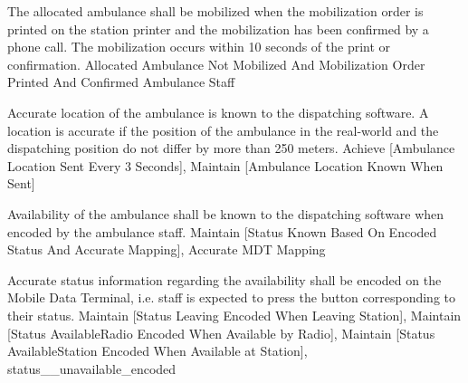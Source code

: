   \startkaosspec
  	 {The allocated ambulance shall be mobilized when the mobilization order is printed on the station printer and the mobilization has been confirmed by a phone call. The mobilization occurs within 10 seconds of the print or confirmation.}
  	 {Allocated Ambulance Not Mobilized And Mobilization Order Printed And Confirmed}
  	 {Ambulance Staff}
  \stopkaosspec

  
    {}

  \startkaosspec
  	 {Accurate location of the ambulance is known to the dispatching software. A location is accurate if the position of the ambulance in the real-world and the dispatching position do not differ by more than 250 meters.}
  	 {Achieve [Ambulance Location Sent Every 3 Seconds], Maintain [Ambulance Location Known When Sent]}
  \stopkaosspec
  
  
    {}

  \startkaosspec
  	 {Availability of the ambulance shall be known to the dispatching software when encoded by the ambulance staff.}
  	 {Maintain [Status Known Based On Encoded Status And Accurate Mapping], Accurate MDT Mapping}
  \stopkaosspec
  
  \startkaosspec
  	 {Accurate status information regarding the availability shall be encoded on the Mobile Data Terminal, i.e. staff is expected to press the button corresponding to their status.}
  	 {Maintain [Status Leaving Encoded When Leaving Station], Maintain [Status AvailableRadio Encoded When Available by Radio], Maintain [Status AvailableStation Encoded When Available at Station], status__unavailable_encoded}
  \stopkaosspec
  
